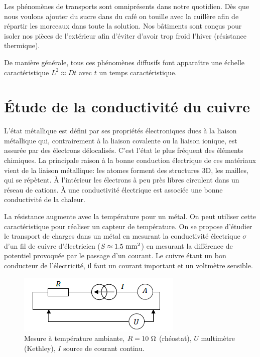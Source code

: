 \documentclass[french]{article}
\begin{document}
Les phénomènes de transports sont omniprésents dans notre quotidien. Dès que nous voulons ajouter du sucre dans du café on touille avec la cuillère afin de répartir les morceaux dans toute la solution. Nos bâtiments sont conçus pour isoler nos pièces de l'extérieur afin d'éviter d'avoir trop froid l'hiver (résistance thermique). 

De manière générale, tous ces phénomènes diffusifs font apparaître une échelle caractéristique $L^2\approx Dt$ avec $t$ un temps caractéristique. 

\section{Étude de la conductivité du cuivre}

L'état métallique est défini par ses propriétés électroniques dues à la liaison métallique qui, contrairement à la liaison covalente ou la liaison ionique, est assurée par des électrons délocalisés. C'est l'état le plus fréquent des éléments chimiques. La principale raison à la bonne conduction électrique de ces matériaux vient de la liaison métallique: les atomes forment des structures 3D, les mailles, qui se répètent. À l'intérieur les électrons à peu près libres circulent dans un réseau de cations. À une conductivité électrique est associée une bonne conductivité de la chaleur. 

La résistance augmente avec la température pour un métal. On peut utiliser cette caractéristique pour réaliser un capteur de température. On se propose d'étudier le transport de charges dans un métal en mesurant la conductivité électrique $\sigma$ d'un fil de cuivre d'électricien ($S\approx 1.5~\rm mm^2$) en mesurant la différence de potentiel provoquée par le passage d'un courant. Le cuivre étant un bon conducteur de l'électricité, il faut un courant important et un voltmètre sensible.

\begin{figure}[ht]
	\centering
	\includegraphics*[width=.5\textwidth]{ConductiviteCuivre.png}
	\caption*{Mesure à température ambiante, $R=10~\rm \Omega$ (rhéostat), $U$ multimètre (Kethley), $I$ source de courant continu.}
\end{figure}
\end{document}
